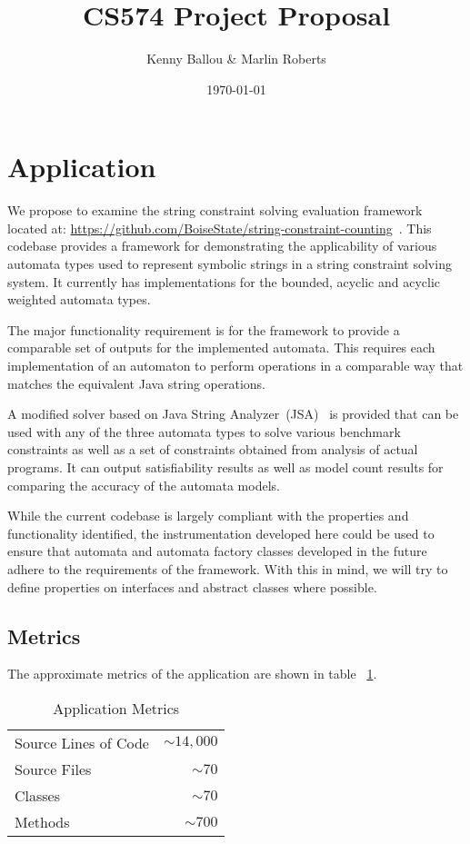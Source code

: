 \documentclass[letterpaper,11pt,twocolumn]{article}
\title{CS574 Project Proposal}
\date{\today}
\author{Kenny Ballou \& Marlin Roberts}
\begin{document}
\maketitle{}
\tableofcontents{}

\section{Application}

We propose to examine the string constraint solving evaluation framework
located at:
\url{https://github.com/BoiseState/string-constraint-counting}~\cite{Sherman_2019}.
This codebase provides a framework for demonstrating the applicability of
various automata types used to represent symbolic strings in a string
constraint solving system.  It currently has implementations for the bounded,
acyclic and acyclic weighted automata types.

The major functionality requirement is for the framework to provide a
comparable set of outputs for the implemented automata.  This requires each
implementation of an automaton to perform operations in a comparable way that
matches the equivalent Java string operations.

A modified solver based on Java String Analyzer~(JSA)~\cite{strings2003} is
provided that can be used with any of the three automata types to solve various
benchmark constraints as well as a set of constraints obtained from analysis of
actual programs.  It can output satisfiability results as well as model count
results for comparing the accuracy of the automata models.

While the current codebase is largely compliant with the properties and
functionality identified, the instrumentation developed here could be used to
ensure that automata and automata factory classes developed in the future
adhere to the requirements of the framework.  With this in mind, we will try to
define properties on interfaces and abstract classes where possible.

\subsection{Metrics}

The approximate metrics of the application are shown in table
~\ref{tab:app-metrics}.


\begin{table}[ht]\label{tab:app-metrics}
  \centering
  \begin{tabular}{lr}
    \toprule
    Source Lines of Code & \(\sim14,000\) \\
    Source Files         & \(\sim70\) \\
    Classes              & \(\sim70\) \\
    Methods              & \(\sim700\) \\
    \bottomrule
  \end{tabular}
  \caption{Application Metrics}
\end{table}
\end{document}
